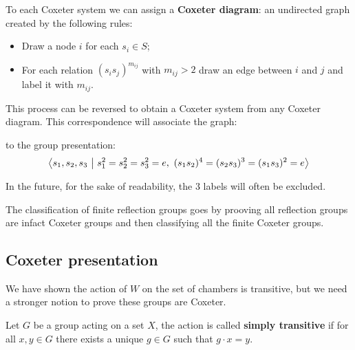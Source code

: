 \documentclass[../main.tex]{subfiles}
\begin{document}
To each Coxeter system we can assign a \textbf{Coxeter diagram}: an undirected graph created by the following rules:\begin{itemize}
    \item Draw a node $i$ for each $s_i\in S$;
    \item For each relation $(s_i s_j)^{m_{ij}}$ with $m_{ij}>2$ draw an edge between $i$ and $j$ and label it with $m_{ij}$.
\end{itemize}

This process can be reversed to obtain a Coxeter system from any Coxeter diagram. This correspondence will associate the graph:
\begin{figure}[!h]
\centering
{}
\end{figure}

to the group presentation: \[
\left\langle s_1,s_2,s_3 \ \middle| \ s_1^2 = s_2^2 = s_3^2 = e, \ (s_1s_2)^4 = (s_2s_3)^3 = (s_1s_3)^2 = e \right\rangle
\]

In the future, for the sake of readability, the $3$ labels will often be excluded.

The classification of finite reflection groups goes by prooving all reflection groups are infact Coxeter groups and then classifying all the finite Coxeter groups.

\subsection{Coxeter presentation}

We have shown the action of $W$ on the set of chambers is transitive, but we need a stronger notion to prove these groups are Coxeter.

\begin{definition}
    Let $G$ be a group acting on a set $X$, the action is called \textbf{simply transitive} if for all $x,y\in G$ there exists a unique $g\in G$ such that $g\cdot x = y$.
\end{definition}
\end{document}
